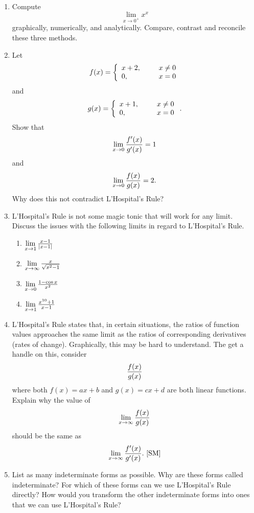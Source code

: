 \begin{enumerate}
\item  Compute $$\mathop {\lim }\limits_{x \to 0^ +  } x^x $$ graphically, numerically, and analytically.  Compare, contrast and reconcile these three methods.  \cite{SBS}


\item  Let 
$$f(x) = \left\{ \begin{array}{lcr}  x + 2, 
     &\ \ \mbox{}& x \ne 0 \cr   
     0, & &x = 0 \cr \end{array}  \right.$$ 
and 
$$g(x) = \left\{ \begin{array}{lcr}  x + 1, 
     &\ \ \mbox{}& x \ne 0 \cr   
     0, & & x = 0 \cr \end{array} \right. .$$  
Show that $$\mathop {\lim }\limits_{x \to 0} {{f'(x)} \over {g'(x)}} = 1$$ and $$\mathop {\lim }\limits_{x \to 0} {{f(x)} \over {g(x)}} = 2.$$  
Why does this not contradict L'Hospital's Rule?  \cite{FWG}


\item  L'Hospital's Rule is not some magic tonic that will work for any limit.  Discuss the issues with the following limits in regard to L'Hospital's Rule.
\begin{enumerate}\item $\mathop {\lim }\limits_{x \to 1} {{x - 1} \over {\left| {x - 1} \right|}}$ \item $\mathop {\lim }\limits_{x \to \infty } {x \over {\sqrt {x^2  - 1} }}$ \item $\mathop {\lim }\limits_{x \to 0} {{1 - \cos x} \over {x^2 }}$ \item $\mathop {\lim }\limits_{x \to 1} {{x^{10}  + 1} \over {x - 1}}$\end{enumerate}

\item  L'Hospital's Rule states that, in certain situations, the ratios of function values approaches the same limit as the ratios of corresponding derivatives (rates of change).  Graphically, this may be hard to understand.  The get a handle on this, consider $${{f(x)} \over {g(x)}}$$ where both 
$f(x) = ax + b$ and $g(x) = cx + d$ are both linear functions.  Explain why the value of $$\mathop {\lim }\limits_{x \to \infty } {{f(x)} \over {g(x)}}$$ should be the same as $$\mathop {\lim }\limits_{x \to \infty } {{f'(x)} \over {g'(x)}}.\ \cite{SM}$$ 

\item  List as many indeterminate forms as possible.  Why are these forms called indeterminate?  For which of these forms can we use L'Hospital's Rule directly?  How would you transform the other indeterminate forms into ones that we can use L'Hospital's Rule?


\end{enumerate}
